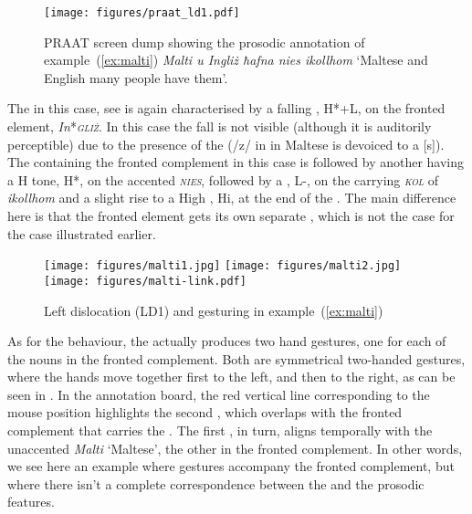 \documentclass[output=paper]{LSP/langsci}
\begin{document}
\begin{figure}[b]
\texttt{[image: figures/praat\_ld1.pdf]}
\caption{PRAAT screen dump showing the prosodic annotation of example~(\ref{ex:malti}) {\em  Malti u Ingliż ħafna nies ikollhom} `Maltese and English many people have them'.}
\label{fig:praat_malti}
\end{figure}


The  in this case, see  is again
characterised by a falling , H*+L, on the fronted element,
{\it In}*{\textit {\textsc {gliż}}}. In this case the fall is not
visible (although it is auditorily perceptible) due to the presence of
the  (/z/ in  in Maltese is devoiced to a
[s]). The   containing the fronted complement in
this case is followed by another   having a H tone,
H*, on the accented  {\textit{\textsc {nies}}}, followed by a
, L-, on the  carrying 
{\textit{\textsc{kol}}} of {\it ikollhom} and a slight rise to a High
, Hi, at the end of the . The main difference here
is that the fronted element gets its own separate , which
is not the case for the  case illustrated earlier.


\begin{figure}[b]
   \texttt{[image: figures/malti1.jpg]}
   \texttt{[image: figures/malti2.jpg]}
   \texttt{[image: figures/malti-link.pdf]}
   \caption{Left dislocation (LD1) and gesturing in example~(\ref{ex:malti})}
\label{fig:malti}
\end{figure}

\newpage 
As for the  behaviour, the  actually produces two hand
gestures, one for each of the nouns in the fronted complement. Both
are symmetrical two-handed gestures, where the hands move together
first to the left, and then to the right, as can be seen in
. In the annotation board, the red vertical
line corresponding to the mouse position highlights the second
, which overlaps with the fronted complement
that carries the . The first , in turn, aligns
temporally with the unaccented \textit{Malti} `Maltese', the other  in
the fronted complement. In other words, we see here an example where
gestures accompany the fronted complement, but where there isn't a
complete correspondence between the  and the prosodic
features.
\newpage 
\end{document}
